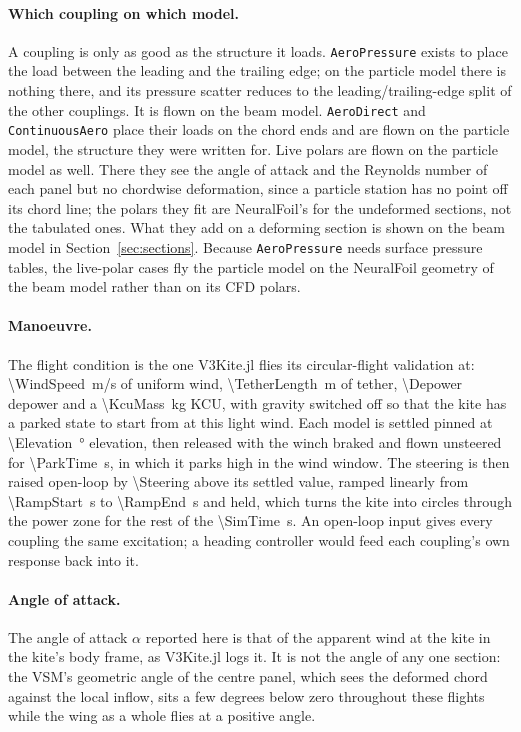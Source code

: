 \documentclass[11pt,a4paper]{article}
\newcommand{\code}[1]{\texttt{#1}}
\begin{document}
\paragraph{Which coupling on which model.} A coupling is only as good as the structure it loads. \code{AeroPressure} exists to place the load between the leading and the trailing edge; on the particle model there is nothing there, and its pressure scatter reduces to the leading/trailing-edge split of the other couplings. It is flown on the beam model. \code{AeroDirect} and \code{ContinuousAero} place their loads on the chord ends and are flown on the particle model, the structure they were written for. Live polars are flown on the particle model as well. There they see the angle of attack and the Reynolds number of each panel but no chordwise deformation, since a particle station has no point off its chord line; the polars they fit are NeuralFoil's for the undeformed sections, not the tabulated ones. What they add on a deforming section is shown on the beam model in Section~\ref{sec:sections}. Because \code{AeroPressure} needs surface pressure tables, the live-polar cases fly the particle model on the NeuralFoil geometry of the beam model rather than on its CFD polars.

\paragraph{Manoeuvre.} The flight condition is the one V3Kite.jl flies its circular-flight validation at: \SI{\WindSpeed}{m/s} of uniform wind, \SI{\TetherLength}{m} of tether, \num{\Depower} depower and a \SI{\KcuMass}{kg} KCU, with gravity switched off so that the kite has a parked state to start from at this light wind. Each model is settled pinned at \SI{\Elevation}{\degree} elevation, then released with the winch braked and flown unsteered for \SI{\ParkTime}{s}, in which it parks high in the wind window. The steering is then raised open-loop by \num{\Steering} above its settled value, ramped linearly from \SI{\RampStart}{s} to \SI{\RampEnd}{s} and held, which turns the kite into circles through the power zone for the rest of the \SI{\SimTime}{s}. An open-loop input gives every coupling the same excitation; a heading controller would feed each coupling's own response back into it.

\paragraph{Angle of attack.} The angle of attack $\alpha$ reported here is that of the apparent wind at the kite in the kite's body frame, as V3Kite.jl logs it. It is not the angle of any one section: the VSM's geometric angle of the centre panel, which sees the deformed chord against the local inflow, sits a few degrees below zero throughout these flights while the wing as a whole flies at a positive angle.
\end{document}
